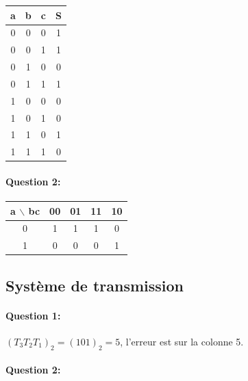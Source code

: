  \begin{center}
 \begin{tabular}{|c|c|c|c|}
 \hline
 a & b & c & S \\
 \hline
 0  & 0  & 0  & 1 \\
 \hline
 0  & 0  & 1  & 1 \\
 \hline
 0  & 1  & 0  & 0 \\
 \hline
 0  & 1  & 1  & 1 \\
 \hline
 1  & 0  & 0  & 0 \\
 \hline
 1  & 0  & 1  & 0 \\
 \hline
 1  & 1  & 0  & 1 \\
 \hline
 1  & 1  & 1  & 0 \\
 \hline
 \end{tabular}
 \end{center}

\paragraph{Question 2:}

\begin{center}
\begin{tabular}{|c|c|c|c|c|}
\hline
a $\backslash$ bc & 00 & 01 & 11 & 10 \\
\hline
0  & 1 & 1 & 1 & 0 \\
\hline
1  & 0 & 0 & 0 & 1 \\
\hline
\end{tabular} 
\end{center}

\subsection{Système de transmission}

\paragraph{Question 1:} $(T_3T_2T_1)_2=(101)_2=5$, l'erreur est sur la colonne 5.

\paragraph{Question 2:} ~\

